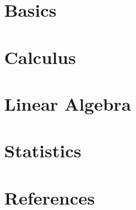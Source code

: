 \section[Basics]{Basics}






% 
% 

\section[Calculus]{Calculus}





% 


\section[LinAlg]{Linear Algebra}



% 
% 

\section[Stats]{Statistics}


% 

% 

% 


\section[Refs]{References}



